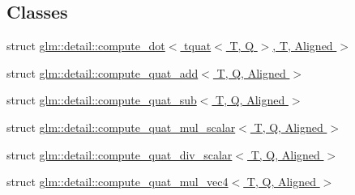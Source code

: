 \subsection*{Classes}
\begin{DoxyCompactItemize}
\item 
struct \hyperlink{structglm_1_1detail_1_1compute__dot_3_01tquat_3_01T_00_01Q_01_4_00_01T_00_01Aligned_01_4}{glm\+::detail\+::compute\+\_\+dot$<$ tquat$<$ T, Q $>$, T, Aligned $>$}
\item 
struct \hyperlink{structglm_1_1detail_1_1compute__quat__add}{glm\+::detail\+::compute\+\_\+quat\+\_\+add$<$ T, Q, Aligned $>$}
\item 
struct \hyperlink{structglm_1_1detail_1_1compute__quat__sub}{glm\+::detail\+::compute\+\_\+quat\+\_\+sub$<$ T, Q, Aligned $>$}
\item 
struct \hyperlink{structglm_1_1detail_1_1compute__quat__mul__scalar}{glm\+::detail\+::compute\+\_\+quat\+\_\+mul\+\_\+scalar$<$ T, Q, Aligned $>$}
\item 
struct \hyperlink{structglm_1_1detail_1_1compute__quat__div__scalar}{glm\+::detail\+::compute\+\_\+quat\+\_\+div\+\_\+scalar$<$ T, Q, Aligned $>$}
\item 
struct \hyperlink{structglm_1_1detail_1_1compute__quat__mul__vec4}{glm\+::detail\+::compute\+\_\+quat\+\_\+mul\+\_\+vec4$<$ T, Q, Aligned $>$}
\end{DoxyCompactItemize}
